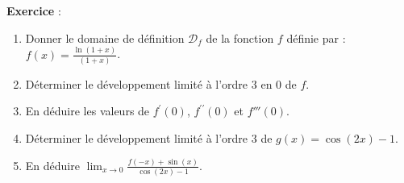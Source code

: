 \documentclass[12pt,a4paper]{article}
\newcommand{\R}{{\mathbb{R}}}
\newcounter{numexo}
\newenvironment{exo}[1][]%
{\stepcounter{numexo}%

\addvspace{\bigskipamount}%
\noindent\textbf{Exercice \thenumexo} : \textit{#1}\nopagebreak[4]%

\addvspace{\smallskipamount}\noindent }%
{%

\addvspace{\bigskipamount}%
}%
\newcounter{exo}
\begin{document}
\vspace{0.3cm}

\begin{exo} 

\begin{enumerate}

\item Donner le domaine de d\'efinition $\mathcal{D}_f$ de la fonction $f$ d\'efinie par : $\displaystyle f(x)=\frac{\ln(1+x)}{(1+x)}$.

\item D\'eterminer le d\'eveloppement limit\'e \`a l'ordre $3$ en $0$ de $f$.
  

\item En d\'eduire les valeurs de $f^\prime(0)$, $f^{\prime\prime}(0)$ et $f'''(0)$.

\item D\'eterminer le d\'eveloppement limit\'e \`a l'ordre 3 de $g(x)=\cos(2x)-1$.

\item En d\'eduire $\displaystyle\lim_{x\to 0}\frac{f(-x)+\sin(x)}{\cos(2x)-1}.$
\end{enumerate}

\end{exo}


\vspace{0.3cm}
\end{document}
